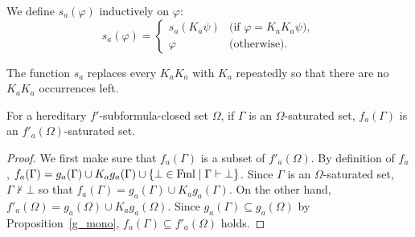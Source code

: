 \begin{definition}
 We define $s_a(\varphi)$ inductively on $\varphi$:
\[
 s_a(\varphi) = \begin{cases}
		 s_a(K_a\psi) & \text{(if $\varphi = K_aK_a\psi$)},\\
		 \varphi & \text{(otherwise)}.
		\end{cases}
\]
\end{definition}
\noindent The function $s_a$ replaces every $K_aK_a$ with $K_a$ repeatedly so that there are no
$K_aK_a$ occurrences left.

\begin{lemma}
\label{fpreserve}
 For a hereditary $f'$-subformula-closed set $\Omega$, 
 if $\Gamma$ is an $\Omega$-saturated set,
 $f_a(\Gamma)$ is an $f'_a(\Omega)$-saturated set.
\end{lemma}
\begin{proof}
 We first make sure that $f_a(\Gamma)$ is a subset of $f'_a(\Omega)$.
 By definition of $f_a$, $f_a(\Gamma) = g_a(\Gamma)\cup
 K_ag_a(\Gamma)\cup\{\bot\in\operatorname{Fml}\mid \Gamma\vdash\bot\}$.
 Since $\Gamma$ is an $\Omega$-saturated set, $\Gamma\not\vdash\bot$ so that
 $f_a(\Gamma) = g_a(\Gamma)\cup K_ag_a(\Gamma)$.
 On the other hand, $f'_a(\Omega) = g_a(\Omega)\cup K_ag_a(\Omega)$.
 Since $g_a(\Gamma)\subseteq g_a(\Omega)$
 by Proposition~\ref{g_mono}, $f_a(\Gamma)\subseteq f'_a(\Omega)$ holds.


\end{proof}
